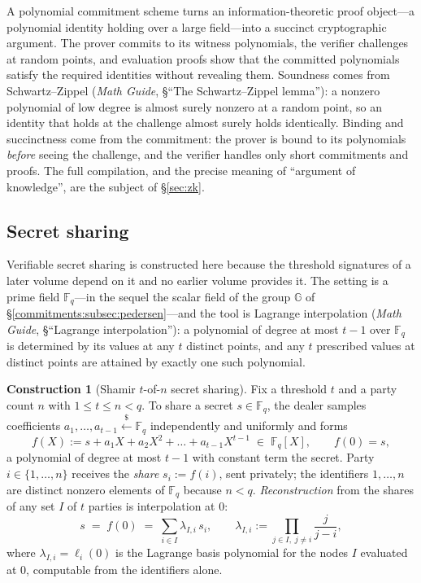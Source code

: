 \documentclass[11pt,a4paper]{article}
\theoremstyle{definition}
\newtheorem{construction}[theorem]{Construction}
\theoremstyle{remark}
\newcommand{\G}{\ensuremath{\mathbb{G}}}
\newcommand{\Fq}{\ensuremath{\mathbb{F}_{q}}}
\begin{document}
A polynomial commitment scheme turns an information-theoretic proof
object---a polynomial identity holding over a large field---into a
succinct cryptographic argument. The prover commits to its witness
polynomials, the verifier challenges at random points, and evaluation
proofs show that the committed polynomials satisfy the required
identities without revealing them. Soundness comes from Schwartz--Zippel
(\emph{Math Guide}, \S``The Schwartz--Zippel lemma''): a nonzero
polynomial of low degree is almost surely nonzero at a random point, so
an identity that holds at the challenge almost surely holds
identically. Binding and succinctness come from the commitment: the
prover is bound to its polynomials \emph{before} seeing the challenge,
and the verifier handles only short commitments and proofs. The full
compilation, and the precise meaning of ``argument of knowledge'', are
the subject of \S\ref{sec:zk}.

\subsection{Secret sharing}\label{commitments:subsec:secret-sharing}

Verifiable secret sharing is constructed here because the threshold
signatures of a later volume depend on it and no earlier volume
provides it. The setting is a prime field \(\Fq\)---in the sequel the
scalar field of the
group \(\G\) of \S\ref{commitments:subsec:pedersen}---and the tool is
Lagrange interpolation (\emph{Math Guide}, \S``Lagrange
interpolation''): a polynomial of degree at most \(t - 1\) over
\(\Fq\) is determined by its values at any \(t\) distinct points, and
any \(t\) prescribed values at distinct points are attained by
exactly one such polynomial.

\begin{construction}[Shamir \(t\)-of-\(n\) secret sharing]
\label{commitments:def:shamir}
Fix a threshold \(t\) and a party count \(n\) with
\(1 \le t \le n < q\). To share a secret \(s \in \Fq\), the dealer
samples coefficients \(a_1, \dots, a_{t-1} \xleftarrow{\$} \Fq\)
independently and uniformly and forms
\[
f(X) := s + a_1 X + a_2 X^{2} + \dots + a_{t-1} X^{t-1}
\;\in\; \Fq[X], \qquad f(0) = s ,
\]
a polynomial of degree at most \(t - 1\) with constant term the
secret. Party \(i \in \{1, \dots, n\}\) receives the \emph{share}
\(s_i := f(i)\), sent privately; the identifiers \(1, \dots, n\) are
distinct nonzero elements of \(\Fq\) because \(n < q\).
\emph{Reconstruction} from the shares of any set \(I\) of \(t\)
parties is interpolation at \(0\):
\[
s \;=\; f(0) \;=\; \sum_{i \in I} \lambda_{I,i}\, s_i ,
\qquad
\lambda_{I,i} := \prod_{j \in I,\; j \ne i} \frac{j}{j - i} ,
\]
where \(\lambda_{I,i} = \ell_i(0)\) is the Lagrange basis polynomial
for the nodes \(I\) evaluated at \(0\), computable from the
identifiers alone.
\end{construction}
\end{document}
